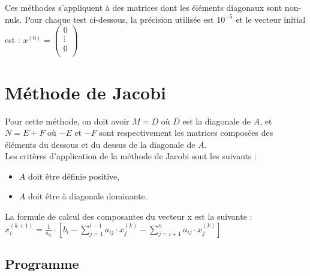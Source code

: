 \documentclass{report}
\begin{document}
      Ces méthodes s'appliquent à des matrices dont les éléments diagonaux sont non-nuls.
      Pour chaque test ci-dessous, la précision utilisée est $10^{-5}$ et le vecteur initial est :
      $x^{(0)} = \begin{pmatrix}
                    0 \\
                    \vdots \\
                    0 \\
                 \end{pmatrix}$
    \section{Méthode de Jacobi}
      Pour cette méthode, on doit avoir $M=D$ où $D$ est la diagonale de $A$, et $N=E+F$ où $-E$ et $-F$ sont respectivement les matrices composées des éléments du dessous et du dessus de la diagonale de $A$.\\
      Les critères d'application de la méthode de Jacobi sont les suivants :
      \begin{itemize}
        \item{$A$ doit être définie positive,}
        \item{$A$ doit être à diagonale dominante.}
      \end{itemize}
      La formule de calcul des composantes du vecteur x est la suivante :
       \newline
      $x_{i}^{(k+1)} = \frac{1}{a_{ii}} \cdot \left [ b_{i} - \sum_{j=1}^{i-1} a_{ij} \cdot x_{j}^{(k)} - \sum_{j=i+1}^{n} a_{ij} \cdot x_{j}^{(k)} \right ] $
      \subsection{Programme}
        
      \newpage
\end{document}
